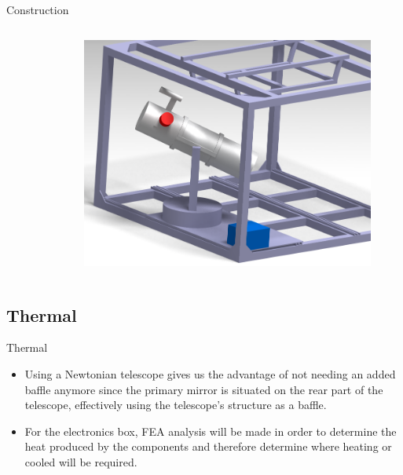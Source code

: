 \documentclass[11pt, aspectratio=169]{beamer}
\begin{document}
\begin{frame}{Construction}
\begin{columns}[t]
\begin{column}{0.3\textwidth}
\begin{figure}
		\end{figure}
	\end{column}
	\begin{column}{0.3\textwidth}
		\begin{figure}
		\centering
		\includegraphics[scale=0.6]{figures/CAD/Assembly_3.png}
		\end{figure}
	\end{column}
\end{columns}
\end{frame}

\subsection{Thermal} 			%
\begin{frame}{Thermal}
\begin{itemize}
	\item Using a Newtonian telescope gives us the 				advantage of not needing an added baffle anymore since 			the 	primary mirror is situated on the rear part of the 		telescope, effectively using the telescope's structure 			as a baffle.
	\item For the electronics box, FEA analysis will be made in order to determine the heat produced by the components and therefore determine where heating or cooled will be required.
\end{itemize}

\end{frame}
\end{document}
